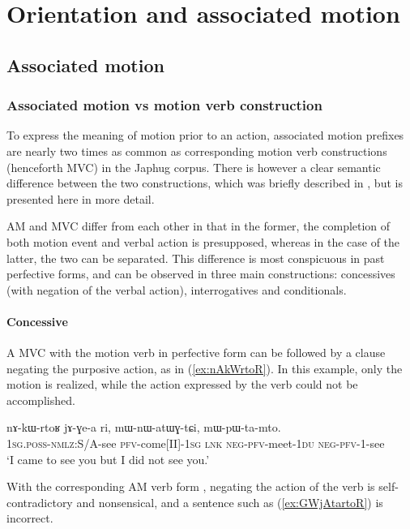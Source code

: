 \chapter{Orientation and associated motion}
\section{Associated motion}
\subsection{Associated motion vs motion verb construction}
To express the meaning of motion prior to an action, associated motion prefixes are nearly two times as common as corresponding motion verb constructions (henceforth MVC) in the Japhug corpus. There is however a clear semantic difference between the two constructions, which was briefly described in \citet{jacques13harmonization}, but is presented here in more detail.

AM and MVC differ from each other in that in the former, the completion of both motion event and verbal action is presupposed, whereas in the case of the latter, the two can be separated. This difference is most conspicuous in past perfective forms, and can be observed in three main constructions: concessives (with negation of the verbal action), interrogatives and conditionals.

\subsubsection{Concessive} \label{sec:am.concessive}
A MVC  with the motion verb in perfective form can be followed by a clause negating the purposive action, as in (\ref{ex:nAkWrtoR}). In this example, only the motion is realized, while the action expressed by the verb  could not be accomplished.

\begin{exe}
\ex \label{ex:nAkWrtoR}
\gll nɤ-kɯ-rtoʁ jɤ-ɣe-a ri, mɯ-nɯ-atɯɣ-tɕi, mɯ-pɯ-ta-mto. \\
\textsc{1sg.poss}-\textsc{nmlz}:S/A-see \textsc{pfv}-come[II]-\textsc{1sg} \textsc{lnk} \textsc{neg}-\textsc{pfv}-meet-\textsc{1du} \textsc{neg}-\textsc{pfv}-1-see \\
\glt `I came to see you but I did not see you.' 
\end{exe}

With the corresponding AM verb form , negating the action of the verb is self-contradictory and nonsensical, and a sentence such as (\ref{ex:GWjAtartoR}) is incorrect.


